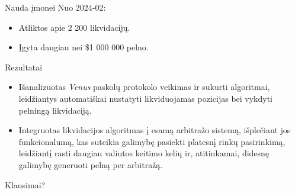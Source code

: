 \documentclass[12pt]{beamer}
\begin{document}
\begin{frame}{Nauda įmonei}
  Nuo 2024-02:
  \begin{itemize}
    \item Atliktos apie 2 200 likvidacijų.
    \item Įgyta daugiau nei \$1 000 000 pelno.
  \end{itemize}
\end{frame}

\begin{frame}{Rezultatai}
  \begin{itemize}
    \item Išanalizuotas \textit{Venus} paskolų protokolo veikimas ir sukurti algoritmai, leidžiantys automatiškai nustatyti likviduojamas pozicijas bei vykdyti pelningą likvidaciją.
    \item Integruotas likvidacijos algoritmas į esamą arbitražo sistemą, išplečiant jos funkcionalumą, kas suteikia galimybę pasiekti platesnį rinkų pasirinkimą, leidžiantį rasti daugiau valiutos keitimo kelių ir, atitinkamai, didesnę galimybę generuoti pelną per arbitražą.
  \end{itemize}
\end{frame}



\begin{frame}
  \centering
  \Large Klausimai?
\end{frame}
\end{document}
